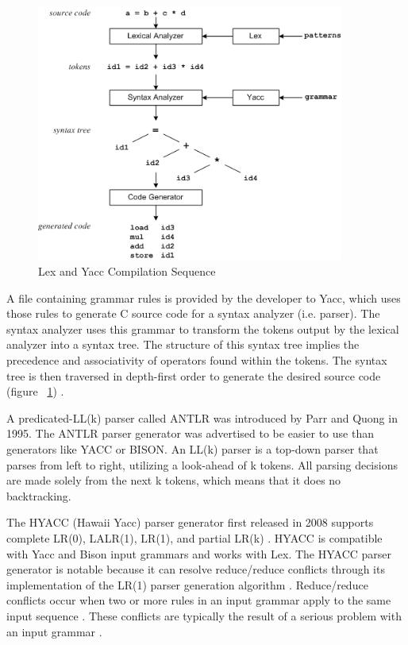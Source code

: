 \begin{figure}[htbp]
\centering
\includegraphics[width=0.9\textwidth]{figures/LexAndYaccCompileSequence.png}
\caption[Lex and Yacc Compilation Sequence]{Lex and Yacc Compilation Sequence \cite{niemann_01}}
\label{fig:LexAndYaccCompileSequence}
\end{figure}

\indent
A file containing grammar rules is provided by the developer to Yacc, which uses those rules to generate C source code for a syntax analyzer (i.e. parser).  The syntax analyzer uses this grammar to transform the tokens output by the lexical analyzer into a syntax tree.  The structure of this syntax tree implies the precedence and associativity of operators found within the tokens.  The syntax tree is then traversed in depth-first order to generate the desired source code (figure ~\ref{fig:LexAndYaccCompileSequence}) \cite{niemann_01}.

\indent
A predicated-LL(k) parser called ANTLR \cite{parr_01} was introduced by Parr and Quong in 1995.  The ANTLR parser generator was advertised to be easier to use than generators like YACC or BISON.  An LL(k) parser is a top-down parser that parses from left to right, utilizing a look-ahead of k tokens.  All parsing decisions are made solely from the next k tokens, which means that it does no backtracking.

\indent
The HYACC (Hawaii Yacc) parser generator first released in 2008 supports complete LR(0), LALR(1), LR(1), and partial LR(k) \cite{chen_01,chen_02}.  HYACC is compatible with Yacc and Bison input grammars and works with Lex.  The HYACC parser generator is notable because it can resolve reduce/reduce conflicts through its implementation of the LR(1) parser generation algorithm \cite{chen_01}.  Reduce/reduce conflicts occur when two or more rules in an input grammar apply to the same input sequence \cite{free_01}.  These conflicts are typically the result of a serious problem with an input grammar \cite{free_01}.

